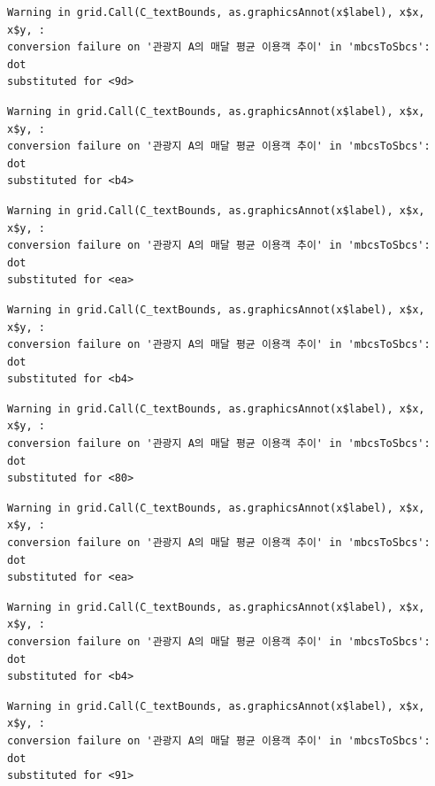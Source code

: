 \documentclass[
  letterpaper,
  DIV=11,
  numbers=noendperiod]{scrreprt}
\begin{document}
\begin{verbatim}
Warning in grid.Call(C_textBounds, as.graphicsAnnot(x$label), x$x, x$y, :
conversion failure on '관광지 A의 매달 평균 이용객 추이' in 'mbcsToSbcs': dot
substituted for <9d>
\end{verbatim}

\begin{verbatim}
Warning in grid.Call(C_textBounds, as.graphicsAnnot(x$label), x$x, x$y, :
conversion failure on '관광지 A의 매달 평균 이용객 추이' in 'mbcsToSbcs': dot
substituted for <b4>
\end{verbatim}

\begin{verbatim}
Warning in grid.Call(C_textBounds, as.graphicsAnnot(x$label), x$x, x$y, :
conversion failure on '관광지 A의 매달 평균 이용객 추이' in 'mbcsToSbcs': dot
substituted for <ea>
\end{verbatim}

\begin{verbatim}
Warning in grid.Call(C_textBounds, as.graphicsAnnot(x$label), x$x, x$y, :
conversion failure on '관광지 A의 매달 평균 이용객 추이' in 'mbcsToSbcs': dot
substituted for <b4>
\end{verbatim}

\begin{verbatim}
Warning in grid.Call(C_textBounds, as.graphicsAnnot(x$label), x$x, x$y, :
conversion failure on '관광지 A의 매달 평균 이용객 추이' in 'mbcsToSbcs': dot
substituted for <80>
\end{verbatim}

\begin{verbatim}
Warning in grid.Call(C_textBounds, as.graphicsAnnot(x$label), x$x, x$y, :
conversion failure on '관광지 A의 매달 평균 이용객 추이' in 'mbcsToSbcs': dot
substituted for <ea>
\end{verbatim}

\begin{verbatim}
Warning in grid.Call(C_textBounds, as.graphicsAnnot(x$label), x$x, x$y, :
conversion failure on '관광지 A의 매달 평균 이용객 추이' in 'mbcsToSbcs': dot
substituted for <b4>
\end{verbatim}

\begin{verbatim}
Warning in grid.Call(C_textBounds, as.graphicsAnnot(x$label), x$x, x$y, :
conversion failure on '관광지 A의 매달 평균 이용객 추이' in 'mbcsToSbcs': dot
substituted for <91>
\end{verbatim}
\end{document}
